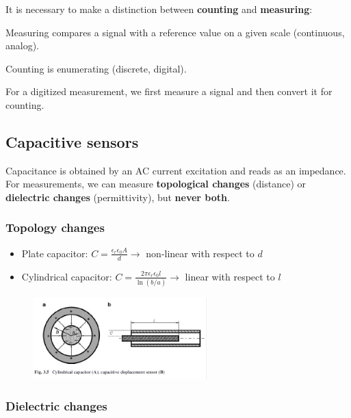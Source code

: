 It is necessary to make a distinction between \textbf{counting} and \textbf{measuring}:

\begin{mydef}
Measuring compares a signal with a reference value on
a given scale (continuous, analog).
\end{mydef}

\begin{mydef}
Counting is enumerating (discrete, digital).
\end{mydef}

For a digitized measurement, we first measure a signal and then convert it for counting.

\subsection{Capacitive sensors}

Capacitance is obtained by an AC current excitation and reads as an impedance. For measurements, we can measure \textbf{topological changes} (distance) or \textbf{dielectric changes} (permittivity), but \textbf{never both}.

\subsubsection{Topology changes}

\begin{itemize}
    \item Plate capacitor: $ C = \frac{\epsilon_r \epsilon_0 A}{d} \rightarrow$ non-linear with respect to $d$
    \item Cylindrical capacitor: $C = \frac{2\pi \epsilon_r \epsilon_0 l}{\ln(b/a)} \rightarrow$ linear with respect to $l$
\end{itemize}

\begin{figure}[H]
    \centering
    \includegraphics[width = 0.6\textwidth]{L2/img/capa-cylindrique.PNG}
\end{figure}

\subsubsection{Dielectric changes}

